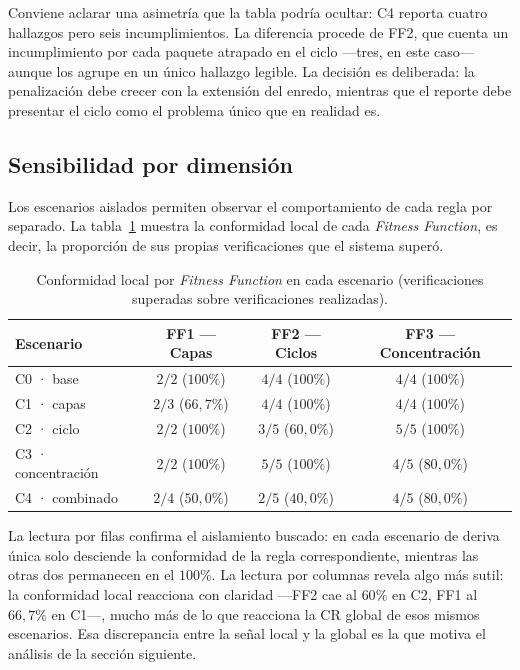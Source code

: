 Conviene aclarar una asimetría que la tabla podría ocultar: C4 reporta cuatro hallazgos pero seis incumplimientos. La diferencia procede de FF2, que cuenta un incumplimiento por cada paquete atrapado en el ciclo ---tres, en este caso--- aunque los agrupe en un único hallazgo legible. La decisión es deliberada: la penalización debe crecer con la extensión del enredo, mientras que el reporte debe presentar el ciclo como el problema único que en realidad es.

\subsection{Sensibilidad por dimensión}
Los escenarios aislados permiten observar el comportamiento de cada regla por separado. La tabla~\ref{tab:sensibilidad} muestra la conformidad local de cada \textit{Fitness Function}, es decir, la proporción de sus propias verificaciones que el sistema superó.

\begin{table}[H]
\centering
\caption{Conformidad local por \textit{Fitness Function} en cada escenario (verificaciones superadas sobre verificaciones realizadas).}
\label{tab:sensibilidad}
\small
\begin{tabular}{lccc}
\toprule
\textbf{Escenario} & \textbf{FF1 — Capas} & \textbf{FF2 — Ciclos} & \textbf{FF3 — Concentración} \\
\midrule
C0 · base          & $2/2$ ($100\%$) & $4/4$ ($100\%$) & $4/4$ ($100\%$) \\
C1 · capas         & $2/3$ ($66{,}7\%$) & $4/4$ ($100\%$) & $4/4$ ($100\%$) \\
C2 · ciclo         & $2/2$ ($100\%$) & $3/5$ ($60{,}0\%$) & $5/5$ ($100\%$) \\
C3 · concentración & $2/2$ ($100\%$) & $5/5$ ($100\%$) & $4/5$ ($80{,}0\%$) \\
C4 · combinado     & $2/4$ ($50{,}0\%$) & $2/5$ ($40{,}0\%$) & $4/5$ ($80{,}0\%$) \\
\bottomrule
\end{tabular}
\end{table}

La lectura por filas confirma el aislamiento buscado: en cada escenario de deriva única solo desciende la conformidad de la regla correspondiente, mientras las otras dos permanecen en el $100\%$. La lectura por columnas revela algo más sutil: la conformidad local reacciona con claridad ---FF2 cae al $60\%$ en C2, FF1 al $66{,}7\%$ en C1---, mucho más de lo que reacciona la CR global de esos mismos escenarios. Esa discrepancia entre la señal local y la global es la que motiva el análisis de la sección siguiente.

